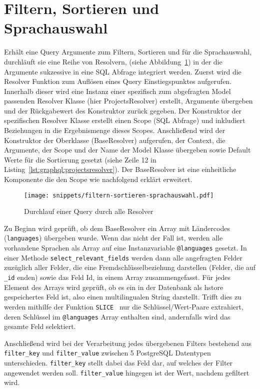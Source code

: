 \section{Filtern, Sortieren und Sprachauswahl}
\label{impl:base-resolver}
Erhält eine Query Argumente zum Filtern, Sortieren und für die Sprachauswahl, durchläuft sie eine Reihe von Resolvern, (siehe Abbildung~\ref{graphql:sorting}) in der die Argumente sukzessive in eine SQL Abfrage integriert werden. Zuerst wird die Resolver Funktion zum Auflösen eines Query Einstiegspunktes aufgerufen. Innerhalb dieser wird eine Instanz einer spezifisch zum abgefragten Model passenden Resolver Klasse (hier ProjectsResolver) erstellt, Argumente übergeben und der Rückgabewert des Konstruktor zurück gegeben. Der Konstruktor der spezifischen Resolver Klasse erstellt einen Scope (SQL Abfrage) und inkludiert Beziehungen in die Ergebnismenge dieses Scopes. Anschließend wird der Konstruktor der Oberklasse (BaseResolver) aufgerufen, der Context, die Argumente, der Scope und der Name der Model Klasse übergeben sowie Default Werte für die Sortierung gesetzt (siehe Zeile 12 in Listing~\ref{lst:graphql:projectsresolver}).
Der BaseResolver ist eine einheitliche Komponente die den Scope wie nachfolgend erklärt erweitert. 

\begin{figure}[h!]
	\centering
	\texttt{[image: snippets/filtern-sortieren-sprachauswahl.pdf]}
	\caption{Durchlauf einer Query durch alle Resolver}
	\label{graphql:sorting}
\end{figure}


Zu Beginn wird geprüft, ob dem BaseResolver ein Array mit Ländercodes (\texttt{languages}) übergeben wurde. Wenn das nicht der Fall ist, werden alle vorhandene Sprachen als Array auf eine Instanzvariable \texttt{@languages} gesetzt. In einer Methode \texttt{select\_relevant\-\_fields} werden dann alle angefragten Felder zuzüglich aller Felder, die eine Fremdschlüsselbeziehung darstellen (Felder, die auf \texttt{\_id} enden) sowie das Feld Id, in einem Array zusammengefasst. Für jedes Element des Arrays wird geprüft, ob es ein in der Datenbank als hstore gespeichertes Feld ist, also einen multilingualen String darstellt.
Trifft dies zu werden mithilfe der Funktion \texttt{SLICE}~\cite{postgresql-hstore} nur die Schlüssel/Wert-Paare extrahiert, deren Schlüssel im \texttt{@languages} Array enthalten sind, andernfalls wird das gesamte Feld selektiert.

Anschließend wird bei der Verarbeitung jedes übergebenen Filters bestehend aus \texttt{filter\_key} und \texttt{filter\_value} zwischen 5 PostgreSQL Datentypen unterschieden.
\texttt{filter\_key} stellt dabei das Feld dar, auf welches der Filter angewendet werden soll. \texttt{filter\_value} hingegen ist der Wert, nachdem gefiltert wird.


